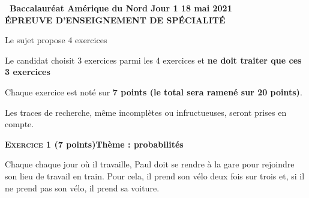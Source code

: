 \documentclass[10pt]{article}
\begin{document}
\setlength\parindent{0mm}
\pagestyle{fancy}
\thispagestyle{empty}

\begin{center}{\Large\textbf{\decofourleft~Baccalauréat Amérique du Nord Jour 1 18 mai 2021~\decofourright\\[6pt] ÉPREUVE D'ENSEIGNEMENT DE SPÉCIALITÉ}}
\end{center}

\vspace{0,25cm}

Le sujet propose 4 exercices

Le candidat choisit 3 exercices parmi les 4 exercices et \textbf{ne doit traiter que ces 3 exercices}

Chaque exercice est noté sur \textbf{7 points (le total sera ramené sur 20 points)}.

Les traces de recherche, même incomplètes ou infructueuses, seront prises en compte.

\bigskip

\textbf{\textsc{Exercice 1} \quad (7 points)\hfill Thème : probabilités}

\medskip

Chaque chaque jour où il travaille, Paul doit se rendre à la gare pour rejoindre son lieu de travail en train. Pour cela, il prend son vélo deux fois sur trois et, si il ne prend pas son vélo, il prend sa voiture.

\medskip
\end{document}

